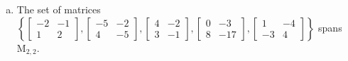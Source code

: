 \begin{exerciseAnswer}
\begin{enumerate}[(a)]
\begin{center}
\begin{minipage}{0.8\textwidth}
\[\begin{array}{cc}
-5 & -2 \\
4 & -5
\end{array}\right] + y_{3} \left[\begin{array}{cc}
4 & -2 \\
3 & -1
\end{array}\right] + y_{4} \left[\begin{array}{cc}
0 & -3 \\
8 & -17
\end{array}\right] + y_{5} \left[\begin{array}{cc}
1 & -4 \\
-3 & 4
\end{array}\right] =B\] has a solution for every \(B \in \mathrm{M}_{2,2}\). 
\end{minipage}\end{center}
    
\item The set of matrices \( \left\{ \left[\begin{array}{cc}
-2 & -1 \\
1 & 2
\end{array}\right] , \left[\begin{array}{cc}
-5 & -2 \\
4 & -5
\end{array}\right] , \left[\begin{array}{cc}
4 & -2 \\
3 & -1
\end{array}\right] , \left[\begin{array}{cc}
0 & -3 \\
8 & -17
\end{array}\right] , \left[\begin{array}{cc}
1 & -4 \\
-3 & 4
\end{array}\right] \right\} \) spans \(\mathrm{M}_{2,2}\). 
\end{enumerate}
    
\end{exerciseAnswer}
    

